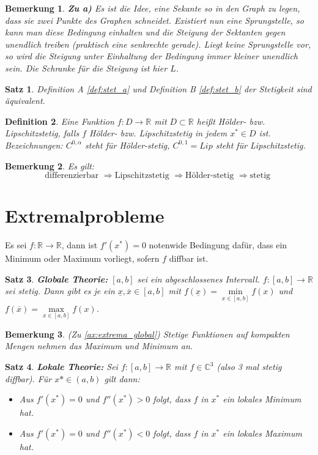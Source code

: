 \documentclass[12pt,a4paper]{report}%
\newtheorem{satz}{Satz}[section]
\newtheorem{definition}[satz]{Definition}
\newtheorem{bem}{Bemerkung}[section]
\numberwithin{equation}{section}
\newcommand{\R}{\mathbb{R}} %
\newcommand{\C}{\mathbb{C}}
\numberwithin{equation}{subsection}
\begin{document}
  \begin{bem}
  \textbf{Zu a)}
    Es ist die Idee, eine Sekante so in den Graph zu legen, dass sie zwei Punkte des Graphen schneidet. Existiert nun eine Sprungstelle, so kann man diese Bedingung einhalten und die Steigung der Sektanten gegen unendlich treiben (praktisch eine senkrechte gerade). Liegt keine Sprungstelle vor, so wird die Steigung unter Einhaltung der Bedingung immer kleiner unendlich sein. Die Schranke für die Steigung ist hier $L$.
  \end{bem}
  \begin{satz}
    Definition A \eqref{def:stet_a} und Definition B \eqref{def:stet_b} der Stetigkeit sind äquivalent.
  \end{satz}
  \begin{definition}
    Eine Funktion $f:D\rightarrow \R$ mit $D \subset \R$ heißt Hölder- bzw. Lipschitzstetig, falls $f$ Hölder- bzw. Lipschitzstetig in jedem $x^* \in D$ ist. \newline
    Bezeichnungen: $C^{0,\alpha}$ steht für Hölder-stetig, $C^{0,1} = Lip$ steht für Lipschitzstetig.
  \end{definition}
  \begin{bem}
    Es gilt:
    \begin{equation}
      \text{differenzierbar } \Rightarrow \text{Lipschitzstetig } \Rightarrow \text{Hölder-stetig } \Rightarrow \text{stetig }
    \end{equation}
  \end{bem}    
  \newpage 
  
\section{Extremalprobleme}
Es sei $f:\R \rightarrow \R$, dann ist $f'(x^*) = 0$ notenwide Bedingung dafür, dass ein Minimum oder Maximum vorliegt, sofern $f$ diffbar ist.
\begin{satz}
  \textbf{Globale Theorie: } $[a,b]$ sei ein abgeschlossenes Intervall. $f:[a,b] \rightarrow \R$ sei stetig. Dann gibt es je ein $\underline{x}, \overline{x} \in [a,b]$ mit $f(\underline{x}) = \min\limits_{x \in [a,b]}f(x)$ und $f(\overline{x}) = \max\limits_{x \in [a,b]}f(x)$.\label{ax:extrema_global}
\end{satz}
\begin{bem} (Zu \eqref{ax:extrema_global})
  Stetige Funktionen auf kompakten Mengen nehmen das Maximum und Minimum an.
\end{bem}
\begin{satz}
  \textbf{Lokale Theorie: } Sei $f:[a,b] \rightarrow \R$ mit $f\in \C^3$ (also 3 mal stetig diffbar). Für $x* \in (a,b)$ gilt dann:
  \begin{itemize}
    \item[a) ] Aus $f'(x^*) = 0$ und $f''(x^*) > 0$ folgt, dass $f$ in $x^*$ ein lokales Minimum hat.
    \item[b) ] Aus $f'(x^*) = 0$ und $f''(x^*) < 0$ folgt, dass $f$ in $x^*$ ein lokales Maximum hat.
  \end{itemize}
\end{satz}
\newpage
\end{document}
